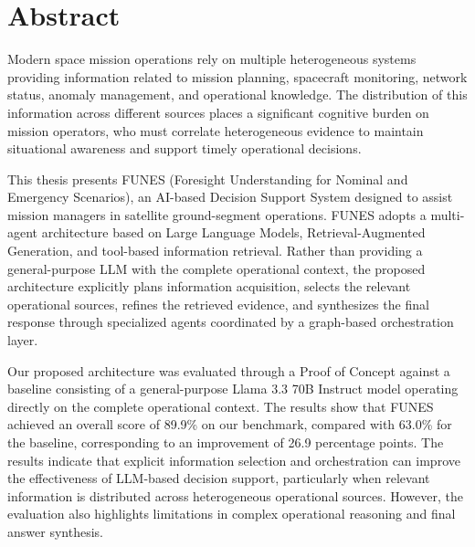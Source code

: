 \thispagestyle{plain}			%
\setlength{\parskip}{0pt plus 1.0pt}
\section*{Abstract}
Modern space mission operations rely on multiple heterogeneous systems providing information related to mission planning, spacecraft monitoring, network status, anomaly management, and operational knowledge. The distribution of this information across different sources places a significant cognitive burden on mission operators, who must correlate heterogeneous evidence to maintain situational awareness and support timely operational decisions.

This thesis presents FUNES (Foresight Understanding for Nominal and Emergency Scenarios), an AI-based Decision Support System designed to assist mission managers in satellite ground-segment operations. FUNES adopts a multi-agent architecture based on Large Language Models, Retrieval-Augmented Generation, and tool-based information retrieval. Rather than providing a general-purpose LLM with the complete operational context, the proposed architecture explicitly plans information acquisition, selects the relevant operational sources, refines the retrieved evidence, and synthesizes the final response through specialized agents coordinated by a graph-based orchestration layer.

Our proposed architecture was evaluated through a Proof of Concept against a baseline consisting of a general-purpose Llama 3.3 70B Instruct model operating directly on the complete operational context. The results show that FUNES achieved an overall score of 89.9\% on our benchmark, compared with 63.0\% for the baseline, corresponding to an improvement of 26.9 percentage points. 
The results indicate that explicit information selection and orchestration can improve the effectiveness of LLM-based decision support, particularly when relevant information is distributed across heterogeneous operational sources. However, the evaluation also highlights limitations in complex operational reasoning and final answer synthesis.
\thispagestyle{empty}
\mbox{}